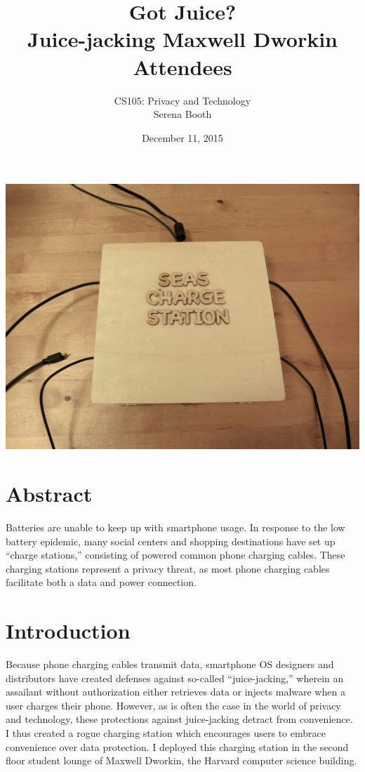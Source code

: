 \documentclass[11pt]{article} %
\title{Got Juice? \\ Juice-jacking Maxwell Dworkin Attendees}
\author{CS105: Privacy and Technology \\ Serena Booth}
\date{December 11, 2015} %
\begin{document}
\maketitle
\doublespacing
{
\centering
\includegraphics[width=\textwidth]{photo}
}
\section{Abstract}

Batteries are unable to keep up with smartphone usage. In response to the low battery epidemic, many social centers and shopping destinations have set up ``charge stations,'' consisting of powered common phone charging cables. These charging stations represent a privacy threat, as most phone charging cables facilitate both a data and power connection. 

\section{Introduction}

Because phone charging cables transmit data, smartphone OS designers and distributors have created defenses against so-called ``juice-jacking,'' wherein an assailant without authorization either retrieves data or injects malware when a user charges their phone. However, as is often the case in the world of privacy and technology, these protections against juice-jacking detract from convenience. I thus created a rogue charging station which encourages users to embrace convenience over data protection. I deployed this charging station in the second floor student lounge of Maxwell Dworkin, the Harvard computer science building. 
\end{document}
